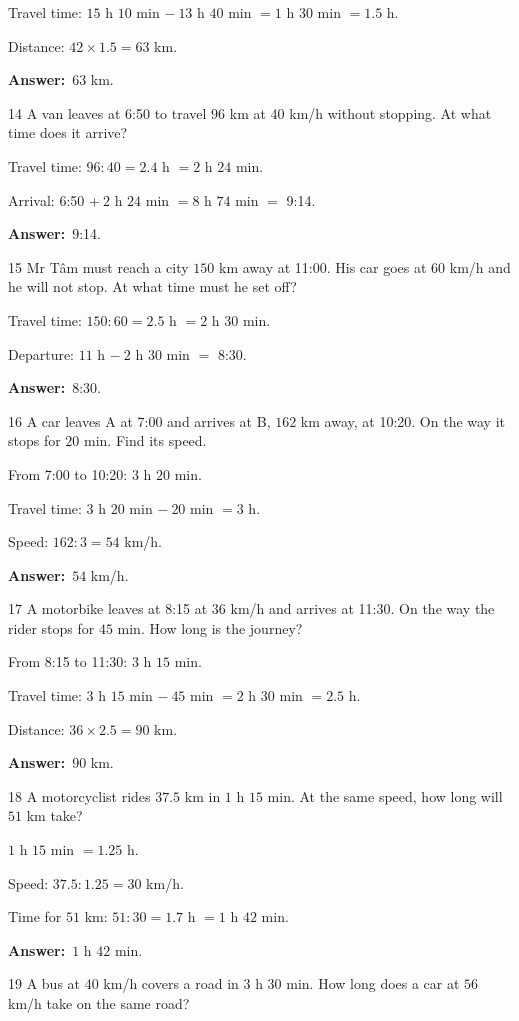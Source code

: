 \documentclass[11pt]{article}
\newif\ifsol \solfalse
\providecommand{\AnsWord}{Đáp số}
\newcommand{\dapso}[1]{\par\textbf{\AnsWord:}\ #1}
\newcommand{\probsol}[1]{%
  \begin{lrbox}{\solmeasure}\begin{minipage}{\dimexpr\linewidth-24pt\relax}#1\end{minipage}\end{lrbox}%
  \ifsol
    \begin{solbox}#1\end{solbox}%
  \else
    \setlength{\solht}{\dimexpr\ht\solmeasure+\dp\solmeasure+0.85cm\relax}%
    \ifdim\solht<1.35cm\setlength{\solht}{1.35cm}\fi
    \begin{tcolorbox}[colback=white,colframe=Line,boxrule=0.8pt,arc=5pt,
      left=8pt,right=8pt,top=4pt,bottom=4pt,height=\solht]{\footnotesize\color{Slate}\itshape\WorkWord}\end{tcolorbox}%
  \fi}
\newcommand{\gap}{\vspace{0.3cm}}
\def\WorkWord{Your work:}
\def\AnsWord{Answer}
\begin{document}
\probsol{
Travel time: $15$ h $10$ min $-\ 13$ h $40$ min $=1$ h $30$ min $=1.5$ h.\par
Distance: $42\times1.5=63$ km.
\dapso{$63$ km.}}
\gap
\begin{probbox}{14}{\relax}
A van leaves at 6:50 to travel $96$ km at $40$ km/h without stopping. At what time does it arrive?
\end{probbox}
\probsol{
Travel time: $96:40=2.4$ h $=2$ h $24$ min.\par
Arrival: 6:50 $+\ 2$ h $24$ min $=8$ h $74$ min $=$ 9:14.
\dapso{9:14.}}
\gap
\begin{probbox}{15}{\relax}
Mr Tâm must reach a city $150$ km away at 11:00. His car goes at $60$ km/h and he will not stop. At what time must he set off?
\end{probbox}
\probsol{
Travel time: $150:60=2.5$ h $=2$ h $30$ min.\par
Departure: $11$ h $-\ 2$ h $30$ min $=$ 8:30.
\dapso{8:30.}}
\gap
\begin{probbox}{16}{\relax}
A car leaves A at 7:00 and arrives at B, $162$ km away, at 10:20. On the way it stops for $20$ min. Find its speed.
\end{probbox}
\probsol{
From 7:00 to 10:20: $3$ h $20$ min.\par
Travel time: $3$ h $20$ min $-\ 20$ min $=3$ h.\par
Speed: $162:3=54$ km/h.
\dapso{$54$ km/h.}}
\gap
\begin{probbox}{17}{\relax}
A motorbike leaves at 8:15 at $36$ km/h and arrives at 11:30. On the way the rider stops for $45$ min. How long is the journey?
\end{probbox}
\probsol{
From 8:15 to 11:30: $3$ h $15$ min.\par
Travel time: $3$ h $15$ min $-\ 45$ min $=2$ h $30$ min $=2.5$ h.\par
Distance: $36\times2.5=90$ km.
\dapso{$90$ km.}}
\gap
\begin{probbox}{18}{\relax}
A motorcyclist rides $37.5$ km in $1$ h $15$ min. At the same speed, how long will $51$ km take?
\end{probbox}
\probsol{
$1$ h $15$ min $=1.25$ h.\par
Speed: $37.5:1.25=30$ km/h.\par
Time for $51$ km: $51:30=1.7$ h $=1$ h $42$ min.
\dapso{$1$ h $42$ min.}}
\gap
\begin{probbox}{19}{\relax}
A bus at $40$ km/h covers a road in $3$ h $30$ min. How long does a car at $56$ km/h take on the same road?
\end{probbox}
\end{document}
